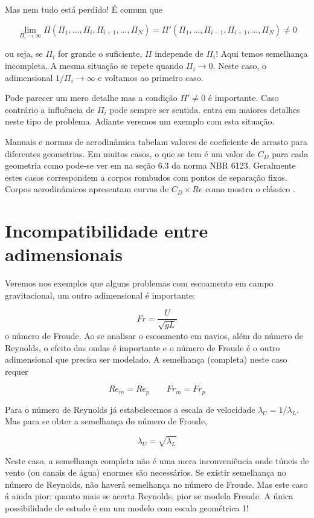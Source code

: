 Mas nem tudo está perdido! É comum que

\[
\lim_{\Pi_i\rightarrow\infty} \Pi\left(\Pi_1, \ldots, \Pi_i, \Pi_{i+1}, \ldots, \Pi_N\right) = \Pi'\left(\Pi_1, \ldots, \Pi_{i-1}, \Pi_{i+1}, \ldots, \Pi_N\right) \ne 0
\]

ou seja, se $\Pi_i$ for grande o suficiente, $\Pi$ independe de $\Pi_i$! Aqui temos semelhança incompleta. A mesma situação se repete quando $\Pi_i \longrightarrow 0$. Neste caso, o adimensional $1/\Pi_i \longrightarrow \infty$ e voltamos ao primeiro caso.

Pode parecer um mero detalhe mas a condição $\Pi' \ne 0$ é importante. Caso contrário a influência de $\Pi_i$ pode sempre ser sentida.  entra em maiores detalhes neste tipo de problema. Adiante veremos um exemplo com esta situação.

Manuais e normas de aerodinâmica tabelam valores de coeficiente de arrasto para diferentes geometrias. Em muitos casos, o que se tem é um valor de $C_D$ para cada geometria como pode-se ver em na seção 6.3 da norma NBR 6123\cite{nbr6123}. Geralmente estes casos correspondem a corpos rombudos com pontos de separação fixos. Corpos aerodinâmicos apresentam curvas de $C_D \times Re$ como mostra o clássico .


\section{Incompatibilidade entre adimensionais}
Veremos nos exemplos que alguns problemas com escoamento em campo gravitacional, um outro adimensional é importante:

\[
Fr = \frac{U}{\sqrt{gL}}
\]
o número de Froude. Ao se analisar o escoamento em navios, além do número de Reynolds, o efeito das ondas é importante e o número de Froude é o outro adimensional que precisa ser modelado. A semelhança (completa) neste caso requer

\[
Re_m = Re_p \qquad Fr_m = Fr_p
\]

Para o número de Reynolds já estabelecemos a escala de velocidade $\lambda_U = 1/\lambda_L$. Mas para se obter a semelhança do número de Froude,

\[
\lambda_U = \sqrt{\lambda_L}
\]

Neste caso, a semelhança completa não é uma mera inconveniência onde túneis de vento (ou canais de água) enormes são necessários. Se existir semelhança no número de Reynolds, não haverá semelhança no número de Froude. Mas este caso á ainda pior: quanto mais se acerta Reynolds, pior se modela Froude. A única possibilidade de estudo é em um modelo com escala geométrica 1!

